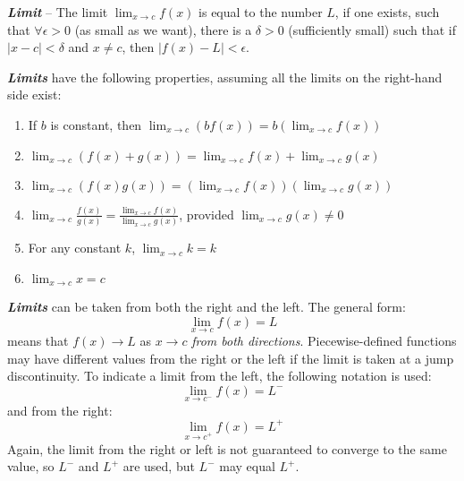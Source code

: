 \vspace{0.1in}
\textbf{\textit{Limit}} -- The limit $\lim_{x\rightarrow c} f(x)$ is equal to the number $L$, if one exists, such that $\forall \epsilon > 0$ (as small as we want), there is a $\delta > 0$ (sufficiently small) such that if $|x - c| < \delta$ and $x \neq c$, then $|f(x) - L| < \epsilon$.

\vspace{0.1in}
\textbf{\textit{Limits}} have the following properties, assuming all the limits on the right-hand side exist:
\begin{enumerate}
\item If $b$ is constant, then $\lim_{x\rightarrow c}\left(bf(x)\right) = b\left(\lim_{x \rightarrow c}f(x)\right)$\\
\vspace{-0.25in}
\item $\lim_{x\rightarrow c}\left(f(x) + g(x)\right) = \lim_{x \rightarrow c} f(x) + \lim_{x \rightarrow c} g(x)$\\
\vspace{-0.25in}
\item  $\lim_{x\rightarrow c}\left(f(x) g(x)\right) =  \left(\lim_{x\rightarrow c}f(x)\right)\left(\lim_{x\rightarrow c}g(x)\right)$\\
\vspace{-0.25in}
\item  $\lim_{x\rightarrow c} \frac{f(x)}{g(x)} = \frac{\lim_{x\rightarrow c}f(x)}{\lim_{x\rightarrow c}g(x)}$, provided $\lim_{x\rightarrow c}g(x) \neq 0$\\
\vspace{-0.25in}
\item For any constant $k$, $\lim_{x\rightarrow c} k = k$\\
\vspace{-0.25in}
\item $\lim_{x\rightarrow c} x = c$
\end{enumerate}

\vspace{0.1in}
\textbf{\textit{Limits}} can be taken from both the right and the left. The general form:
\begin{equation}
\lim_{x\rightarrow c} f(x) = L
\end{equation}
means that $f(x) \rightarrow L$ as $x \rightarrow c$ \textit{from both directions}. Piecewise-defined functions may have different values from the right or the left if the limit is taken at a jump discontinuity. To indicate a limit from the left, the following notation is used:
\begin{equation}
\lim_{x\rightarrow c^-} f(x) = L^-
\end{equation}
and from the right:
\begin{equation}
\lim_{x\rightarrow c^+} f(x) = L^+
\end{equation}
Again, the limit from the right or left is not guaranteed to converge to the same value, so $L^-$ and $L^+$ are used, but  $L^-$ may equal $L^+$.

